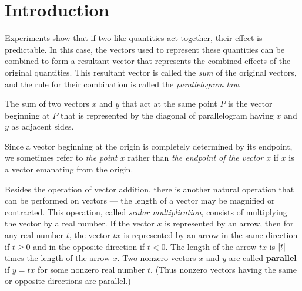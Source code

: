 \section{Introduction}\label{sec:1.1}

\begin{note}
  Experiments show that if two like quantities act together, their effect is predictable.
  In this case, the vectors used to represent these quantities can be combined to form a resultant vector that represents the combined effects of the original quantities.
  This resultant vector is called the \emph{sum} of the original vectors, and the rule for their combination is called the \emph{parallelogram law}.
\end{note}

\begin{ax}\label{1.1.1}
  The sum of two vectors \(x\) and \(y\) that act at the same point \(P\) is the vector beginning at \(P\) that is represented by the diagonal of parallelogram having \(x\) and \(y\) as adjacent sides.
\end{ax}

\begin{note}
  Since a vector beginning at the origin is completely determined by its endpoint, we sometimes refer to \emph{the point \(x\)} rather than \emph{the endpoint of the vector \(x\)} if \(x\) is a vector emanating from the origin.
\end{note}

\begin{note}
  Besides the operation of vector addition, there is another natural operation that can be performed on vectors
  --- the length of a vector may be magnified or contracted.
  This operation, called \emph{scalar multiplication}, consists of multiplying the vector by a real number.
  If the vector \(x\) is represented by an arrow, then for any real number \(t\), the vector \(tx\) is represented by an arrow in the same direction if \(t \geq 0\) and in the opposite direction if \(t < 0\).
  The length of the arrow \(tx\) is \(\left\lvert t\right\rvert\) times the length of the arrow \(x\).
  Two nonzero vectors \(x\) and \(y\) are called \textbf{parallel} if \(y = tx\) for some nonzero real number \(t\).
  (Thus nonzero vectors having the same or opposite directions are parallel.)
\end{note}
